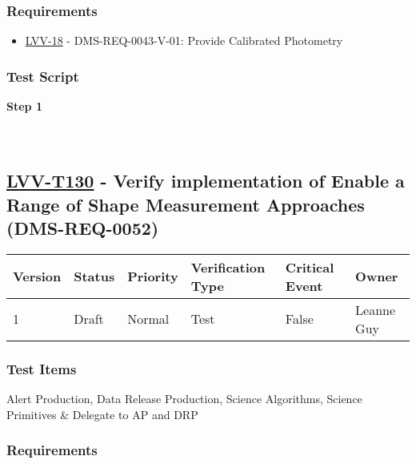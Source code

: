 \hypertarget{requirements-106}{%
\subsubsection{Requirements}\label{requirements-106}}

\begin{itemize}
\tightlist
\item
  \href{https://jira.lsstcorp.org/browse/LVV-18}{LVV-18} -
  DMS-REQ-0043-V-01: Provide Calibrated Photometry
\end{itemize}

\hypertarget{test-script-106}{%
\subsubsection{Test Script}\label{test-script-106}}

\textbf{Step 1}\\
~\\
~\\

\hypertarget{lvv-t130---verify-implementation-of-enable-a-range-of-shape-measurement-approaches-dms-req-0052}{%
\subsection{\texorpdfstring{\href{https://jira.lsstcorp.org/secure/Tests.jspa\#/testCase/LVV-T130}{LVV-T130}
- Verify implementation of Enable a Range of Shape Measurement
Approaches
(DMS-REQ-0052)}{LVV-T130 - Verify implementation of Enable a Range of Shape Measurement Approaches (DMS-REQ-0052)}}\label{lvv-t130---verify-implementation-of-enable-a-range-of-shape-measurement-approaches-dms-req-0052}}

\begin{longtable}[]{@{}llllll@{}}
\toprule
Version & Status & Priority & Verification Type & Critical Event &
Owner\tabularnewline
\midrule
\endhead
1 & Draft & Normal & Test & False & Leanne Guy\tabularnewline
\bottomrule
\end{longtable}

\hypertarget{test-items-106}{%
\subsubsection{Test Items}\label{test-items-106}}

Alert Production, Data Release Production, Science Algorithms, Science
Primitives \& Delegate to AP and DRP

\hypertarget{requirements-107}{%
\subsubsection{Requirements}\label{requirements-107}}

